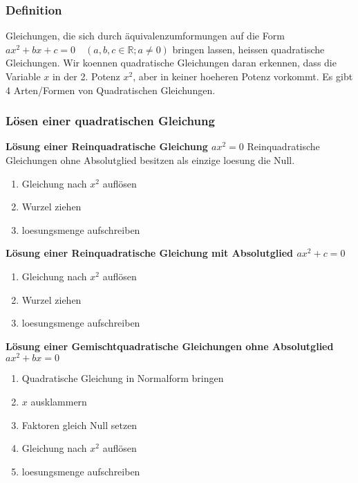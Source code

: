 \begin{multicols}{2}
    \subsubsection{Definition}
    \vspace{-4mm}
    Gleichungen, die sich durch äquivalenzumformungen auf die Form $ax^2 + bx + c = 0 \quad (a, b, c \in \mathbb{R}; a \neq 0)$
    bringen lassen, heissen quadratische Gleichungen. Wir koennen quadratische Gleichungen daran erkennen, dass die Variable $x$ in der 2. Potenz $x^2$, aber in keiner hoeheren Potenz vorkommt. Es gibt 4 Arten/Formen von Quadratischen Gleichungen.
    \subsubsection{Lösen einer quadratischen Gleichung}
    \vspace{-4mm}
    \textbf{Lösung einer Reinquadratische Gleichung $ax^2 = 0$}
    Reinquadratische Gleichungen ohne Absolutglied besitzen als einzige loesung die Null.

    \begin{enumerate}
        \item Gleichung nach $x^2$ auflösen
        \item Wurzel ziehen
        \item loesungsmenge aufschreiben
    \end{enumerate}
    \textbf{Lösung einer Reinquadratische Gleichung mit Absolutglied $ax^2 + c = 0$}

    \begin{enumerate}
        \item Gleichung nach $x^2$ auflösen
        \item Wurzel ziehen
        \item loesungsmenge aufschreiben
    \end{enumerate}
    \textbf{Lösung einer Gemischtquadratische Gleichungen ohne Absolutglied $ax^2 + bx = 0$}

    \begin{enumerate}
        \item Quadratische Gleichung in Normalform bringen
        \item $x$ ausklammern
        \item  Faktoren gleich Null setzen
        \item Gleichung nach $x^2$ auflösen
        \item loesungsmenge aufschreiben
    \end{enumerate}


\end{multicols}
